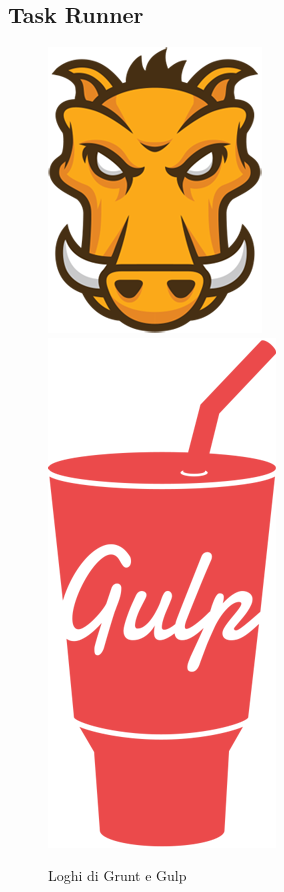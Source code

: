 \subsection{Task Runner}
\label{sec:task_runner}
\begin{figure}
  \vspace{-65pt}
  \begin{center}
    \includegraphics[scale=0.4]{Figures/grunt-logo.png}
	\includegraphics[scale=0.3]{Figures/gulp-logo.png}  
  \end{center}
  \vspace{-10pt}
  \caption{Loghi di Grunt e Gulp}
  \label{fig:task runner}
  \vspace{0pt}
\end{figure}

